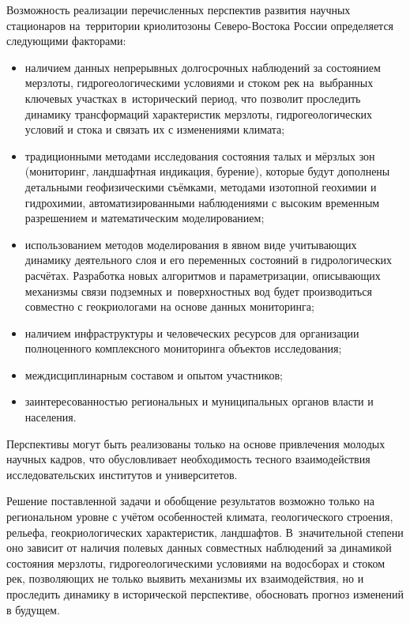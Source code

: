 Возможность реализации перечисленных перспектив развития научных стационаров на~территории криолитозоны Северо-Востока России определяется следующими факторами:
\begin{itemize}[noitemsep]\vspace{-6pt}
\item наличием данных непрерывных долгосрочных наблюдений за состоянием мерзлоты, гидрогеологическими условиями и стоком рек на~выбранных ключевых участках в~исторический период, что позволит проследить динамику трансформаций характеристик мерзлоты, гидрогеологических условий и стока и связать их с изменениями климата;\vspace{2pt}
\item традиционными методами исследования состояния талых и мёрзлых зон (мониторинг, ландшафтная индикация, бурение), которые будут дополнены детальными геофизическими съёмками, методами изотопной геохимии и гидрохимии, автоматизированными наблюдениями с высоким временным разрешением и математическим моделированием;\vspace{2pt}
\item использованием методов моделирования в явном виде учитывающих динамику деятельного слоя и его переменных состояний в гидрологических расчётах. Разработка новых алгоритмов и параметризации, описывающих механизмы связи подземных и~поверхностных вод будет производиться совместно с геокриологами на основе данных мониторинга;\vspace{2pt}
\item наличием инфраструктуры и человеческих ресурсов для организации полноценного комплексного мониторинга объектов исследования;\vspace{2pt}
\item междисциплинарным составом и опытом участников;\vspace{2pt}
\item заинтересованностью региональных и муниципальных органов власти и населения.
\end{itemize}
 \vspace{-6pt}

Перспективы могут быть реализованы только на основе привлечения молодых научных кадров, что обусловливает необходимость тесного взаимодействия исследовательских институтов и университетов.

Решение поставленной задачи и обобщение результатов возможно только на региональном уровне с учётом особенностей климата, геологического строения, рельефа, геокриологических характеристик, ландшафтов. В~значительной степени оно зависит от наличия полевых данных совместных наблюдений за динамикой состояния мерзлоты, гидрогеологическими условиями на водосборах и стоком рек, позволяющих не только выявить механизмы их взаимодействия, но и проследить динамику в исторической перспективе, обосновать прогноз изменений в будущем.

